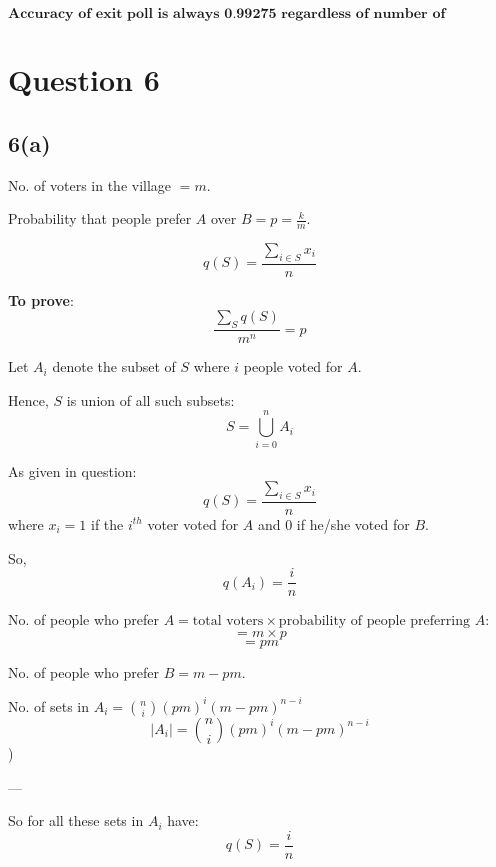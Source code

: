\documentclass[12pt]{article}
\begin{document}
\[
\boxed{\textbf{Accuracy of exit poll is always 0.99275 regardless of number of residents.}}
\]

\section{Question 6}
\subsection{6(a)}

No. of voters in the village $= m$.

Probability that people prefer $A$ over $B = p = \frac{k}{m}$.

\[
q(S) = \frac{\sum\limits_{i \in S} x_i}{n}
\]

\textbf{To prove}:
\[
\frac{\sum\limits_{S} q(S)}{m^n} = p
\]

Let $A_i$ denote the subset of $S$ where $i$ people voted for $A$.

Hence, $S$ is union of all such subsets:
\[
S = \bigcup_{i=0}^{n} A_i
\]

As given in question:
\[
q(S) = \frac{\sum\limits_{i \in S} x_i}{n}
\]
where $x_i = 1$ if the $i^{th}$ voter voted for $A$ and $0$ if he/she voted for $B$.

So,
\[
q(A_i) = \frac{i}{n}
\]

No. of people who prefer $A = \text{total voters} \times \text{probability of people preferring $A$}$:
\[
= m \times p
\]
\[
= pm
\]

No. of people who prefer $B = m - pm$.

No. of sets in $A_i = \binom{n}{i} (pm)^i (m - pm)^{n-i}$
\[
|A_i| = \binom{n}{i} (pm)^i (m - pm)^{n-i}\] \quad {})


---

So for all these sets in $A_i$ have:
\[
q(S) = \frac{i}{n}
\]
\end{document}
